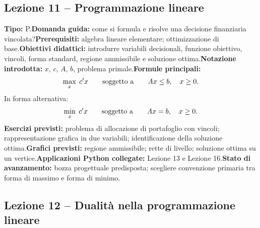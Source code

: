 \documentclass[12pt,a4paper]{article}%
\begin{document}
\subsection{Lezione 11 -- Programmazione lineare}

\textbf{Tipo:} P.\newline\textbf{Domanda guida:} come si formula e risolve una
decisione finanziaria vincolata?\newline\textbf{Prerequisiti:} algebra lineare
elementare; ottimizzazione di base.\newline\textbf{Obiettivi didattici:}
introdurre variabili decisionali, funzione obiettivo, vincoli, forma standard,
regione ammissibile e soluzione ottima.\newline\textbf{Notazione introdotta:}
$x$, $c$, $A$, $b$, problema primale.\newline\textbf{Formule principali:}
\[
\max_{x} \; c^{\prime}x \qquad\hbox{soggetto a} \qquad Ax\leq b, \quad
x\geq0.
\]
In forma alternativa:
\[
\min_{x} \; c^{\prime}x \qquad\hbox{soggetto a} \qquad Ax=b, \quad x\geq0.
\]
\textbf{Esercizi previsti:} problema di allocazione di portafoglio con
vincoli; rappresentazione grafica in due variabili; identificazione della
soluzione ottima.\newline\textbf{Grafici previsti:} regione ammissibile; rette
di livello; soluzione ottima su un vertice.\newline\textbf{Applicazioni Python
collegate:} Lezione 13 e Lezione 16.\newline\textbf{Stato di avanzamento:}
bozza progettuale predisposta; scegliere convenzione primaria tra forma di
massimo e forma di minimo.

\subsection{Lezione 12 -- Dualit\`{a} nella programmazione lineare}
\end{document}
